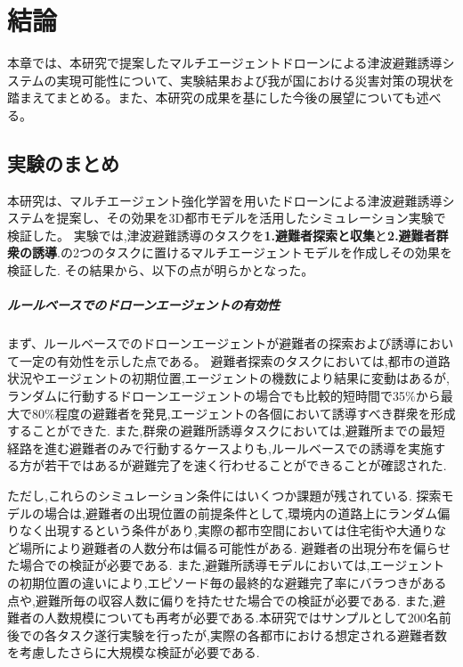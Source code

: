 \chapter{結論}
本章では、本研究で提案したマルチエージェントドローンによる津波避難誘導システムの実現可能性について、実験結果および我が国における災害対策の現状を踏まえてまとめる。また、本研究の成果を基にした今後の展望についても述べる。

\section{実験のまとめ}
本研究は、マルチエージェント強化学習を用いたドローンによる津波避難誘導システムを提案し、その効果を3D都市モデルを活用したシミュレーション実験で検証した。
実験では,津波避難誘導のタスクを\textbf{1.避難者探索と収集}と\textbf{2.避難者群衆の誘導}.の2つのタスクに置けるマルチエージェントモデルを作成しその効果を検証した.
その結果から、以下の点が明らかとなった。

\paragraph{ルールベースでのドローンエージェントの有効性}
まず、ルールベースでのドローンエージェントが避難者の探索および誘導において一定の有効性を示した点である。
避難者探索のタスクにおいては,都市の道路状況やエージェントの初期位置,エージェントの機数により結果に変動はあるが,
ランダムに行動するドローンエージェントの場合でも比較的短時間で35\%から最大で80\%程度の避難者を発見,エージェントの各個において誘導すべき群衆を形成することができた.
また,群衆の避難所誘導タスクにおいては,避難所までの最短経路を進む避難者のみで行動するケースよりも,ルールベースでの誘導を実施する方が若干ではあるが避難完了を速く行わせることができることが確認された.

ただし,これらのシミュレーション条件にはいくつか課題が残されている.
探索モデルの場合は,避難者の出現位置の前提条件として,環境内の道路上にランダム偏りなく出現するという条件があり,実際の都市空間においては住宅街や大通りなど場所により避難者の人数分布は偏る可能性がある.
避難者の出現分布を偏らせた場合での検証が必要である.
また,避難所誘導モデルにおいては,エージェントの初期位置の違いにより,エピソード毎の最終的な避難完了率にバラつきがある点や,避難所毎の収容人数に偏りを持たせた場合での検証が必要である.
また,避難者の人数規模についても再考が必要である.本研究ではサンプルとして200名前後での各タスク遂行実験を行ったが,実際の各都市における想定される避難者数を考慮したさらに大規模な検証が必要である.

